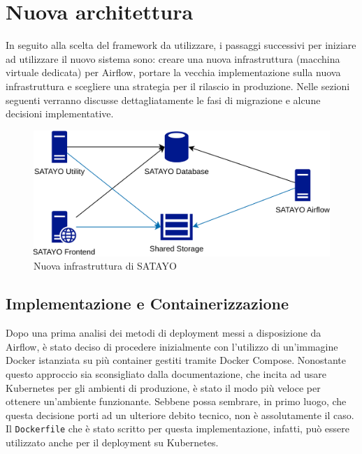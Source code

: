 \chapter{Nuova architettura}
\label{cha:nuova_architettura}

In seguito alla scelta del framework da utilizzare, i passaggi successivi per iniziare
ad utilizzare il nuovo sistema sono: creare una nuova infrastruttura (macchina virtuale
dedicata) per Airflow, portare la vecchia implementazione sulla nuova infrastruttura
e scegliere una strategia per il rilascio in produzione. Nelle sezioni seguenti
verranno discusse dettagliatamente le fasi di migrazione e alcune decisioni
implementative.

\begin{figure}[htbp]
  \centering
  \includegraphics[width=.7\linewidth]{images/SATAYO_infrastructure_new.png}
  \caption{Nuova infrastruttura di SATAYO}
  \label{fig:infra_new}
\end{figure}

\section{Implementazione e Containerizzazione}
\label{sec:impl_container}

Dopo una prima analisi dei metodi di deployment messi a disposizione da Airflow,
è stato deciso di procedere inizialmente con l'utilizzo di un'immagine Docker\cite{docker}
istanziata su più container gestiti tramite Docker Compose. Nonostante questo approccio
sia sconsigliato dalla documentazione, che incita ad usare Kubernetes per gli
ambienti di produzione, è stato il modo più veloce per ottenere un'ambiente funzionante.
Sebbene possa sembrare, in primo luogo, che questa decisione porti ad un
ulteriore debito tecnico, non è assolutamente il caso. Il \texttt{Dockerfile} che
è stato scritto per questa implementazione, infatti, può essere utilizzato anche
per il deployment su Kubernetes.

